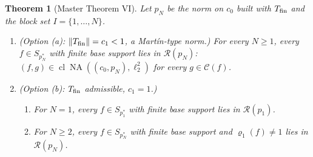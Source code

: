 \documentclass[10pt]{amsart}
\newtheorem{theorem}{Theorem}[section]
\theoremstyle{definition}
\theoremstyle{remark}
\newcommand{\NA}{\operatorname{NA}}
\newcommand{\Cset}{\mathcal C}
\newcommand{\cl}{\operatorname{cl}}
\newcommand{\Rec}{\mathcal R}
\begin{document}
\begin{theorem}[Master Theorem VI]\label{thm:III-MTVI}
Let $p_N$ be the norm on $c_0$ built with $T_{\rm fin}$ and the block set
$I=\{1,\dots,N\}$.
\begin{enumerate}
\item[(a)] \textup{(Option (a): $\|T_{\rm fin}\|=c_1<1$, a Mart\'in-type norm.)}  For
every $N\ge1$, every $f\in S_{p_N^*}$ with finite base support lies in
$\Rec(p_N)$: $(f,g)\in\cl\NA((c_0,p_N),\ell_2^2)$ for every $g\in\Cset(f)$.
\item[(b)] \textup{(Option (b): $T_{\rm fin}$ admissible, $c_1=1$.)}
\begin{enumerate}
\item[(b1)] For $N=1$, every $f\in S_{p_1^*}$ with finite base support lies in
$\Rec(p_1)$.
\item[(b2)] For $N\ge2$, every $f\in S_{p_N^*}$ with finite base support and
$\varrho_1(f)\ne1$ lies in $\Rec(p_N)$.
\end{enumerate}
\end{enumerate}
\end{theorem}
\end{document}
